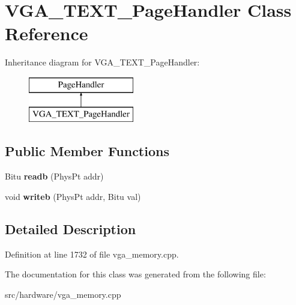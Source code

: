 \hypertarget{classVGA__TEXT__PageHandler}{\section{V\-G\-A\-\_\-\-T\-E\-X\-T\-\_\-\-Page\-Handler Class Reference}
\label{classVGA__TEXT__PageHandler}
}
Inheritance diagram for V\-G\-A\-\_\-\-T\-E\-X\-T\-\_\-\-Page\-Handler\-:\begin{figure}[H]
\begin{center}
\leavevmode
\includegraphics[height=2.000000cm]{classVGA__TEXT__PageHandler}
\end{center}
\end{figure}
\subsection*{Public Member Functions}
\begin{DoxyCompactItemize}
\item 
\hypertarget{classVGA__TEXT__PageHandler_a1db1f4c74e3117342a06f43326d94ce4}{Bitu {\bfseries readb} (Phys\-Pt addr)}\label{classVGA__TEXT__PageHandler_a1db1f4c74e3117342a06f43326d94ce4}

\item 
\hypertarget{classVGA__TEXT__PageHandler_a7615ff08d8fef7047adb7e2176561829}{void {\bfseries writeb} (Phys\-Pt addr, Bitu val)}\label{classVGA__TEXT__PageHandler_a7615ff08d8fef7047adb7e2176561829}

\end{DoxyCompactItemize}


\subsection{Detailed Description}


Definition at line 1732 of file vga\-\_\-memory.\-cpp.



The documentation for this class was generated from the following file\-:\begin{DoxyCompactItemize}
\item 
src/hardware/vga\-\_\-memory.\-cpp\end{DoxyCompactItemize}
